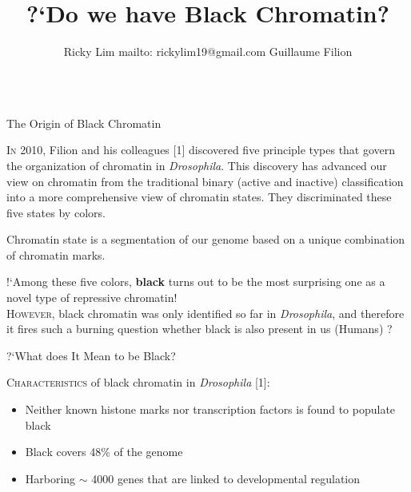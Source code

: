 \documentclass[serif,mathserif,final]{beamer}
\title{\Huge{?`Do we have  Black Chromatin?}}
\author{Ricky Lim {\tiny mailto: rickylim19@gmail.com} \quad Guillaume Filion }
\institute{\small Centre for Genomic Regulation (CRG), Barcelona, ES\\ Universiteit van Amsterdam (UvA), Amsterdam, NL}
\begin{document}
\begin{frame}{}
  \begin{columns}[t]

    \begin{column}{0.32\linewidth}

      \begin{block}{The Origin of Black Chromatin}
      
      \lettrine[lines=3,findent=0pt, nindent=1pt]{I}{n} 2010, Filion and his colleagues [1] discovered five principle types that govern the organization of chromatin in \textit{Drosophila}. This discovery has advanced our view on chromatin from the traditional binary (active and inactive) classification into a more comprehensive view of chromatin states. They discriminated these five states by colors.\\[20pt] 
      
        \begin{shadequote}
        		\small Chromatin state is a segmentation of our genome based on a unique combination of chromatin marks. 
       	\end{shadequote}
	
       !`Among these five colors, {\bf black} turns out to be the most surprising one as a novel type of repressive chromatin!\\[8pt] 
        \lettrine[lines=1,findent=0pt, nindent=1pt]{H}{owever}, black chromatin was only identified so far in \textit{Drosophila}, and therefore it fires such a burning question whether black is also present in us (Humans) ?
        
     
       \end{block}
       
      \begin{block}{?`What does It Mean to be Black?}
        
      \lettrine[lines=1,findent=0pt, nindent=1pt]{C}{haracteristics} of black chromatin in \textit{Drosophila} [1]:\\[5pt]
      \begin{itemize}
     	 \item Neither known histone marks nor transcription factors is found to populate black
          \item Black covers 48\% of the genome
          \item Harboring $\sim$ 4000 genes that are linked to developmental regulation\\[12pt]   
      \end{itemize}
        

\end{block}
\end{column}
\end{columns}
\end{frame}
\end{document}
